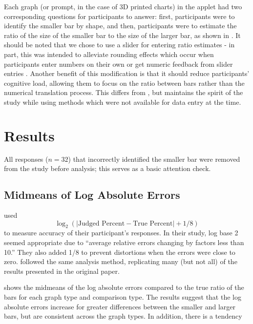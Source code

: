 \documentclass[letterpaper,inpress,dvipsnames]{jdsart}
\begin{document}
Each graph (or prompt, in the case of 3D printed charts) in the applet had two corresponding questions for participants to answer: first, participants were to identify the smaller bar by shape, and then, participants were to estimate the ratio of the size of the smaller bar to the size of the larger bar, as shown in .
It should be noted that we chose to use a slider for entering ratio estimates - in part, this was intended to alleviate rounding effects which occur when participants enter numbers on their own or get numeric feedback from slider entries \citep{ruudUncertaintyCausesRounding2014a, maineriSliderBarsMultiDevice2021}.
Another benefit of this modification is that it should reduce participants' cognitive load, allowing them to focus on the ratio between bars rather than the numerical translation process.
This differs from \citet{clevelandGraphical1984}, but maintains the spirit of the study while using methods which were not available for data entry at the time.

\hypertarget{results}{%
\section{Results}\label{results}}

All responses (\(n = 32\)) that incorrectly identified the smaller bar were removed from the study before analysis; this serves as a basic attention check.

\hypertarget{midmeans-of-log-absolute-errors}{%
\subsection{Midmeans of Log Absolute Errors}\label{midmeans-of-log-absolute-errors}}

\citeauthor{clevelandGraphical1984} used
\[\log_2(|\text{Judged Percent} - \text{True Percent}|+1/8)\]
to measure accuracy of their participant's responses.
In their study, log base 2 seemed appropriate due to ``average relative errors changing by factors less than 10.''
They also added 1/8 to prevent distortions when the errors were close to zero.
\citet{heerCrowdsourcingGraphicalPerception2010b} followed the same analysis method, replicating many (but not all) of the results presented in the original paper.

 shows the midmeans of the log absolute errors compared to the true ratio of the bars for each graph type and comparison type.
The results suggest that the log absolute errors increase for greater differences between the smaller and larger bars, but are consistent across the graph types. In addition, there is a tendency
\end{document}
